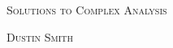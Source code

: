 \documentclass[dvipsnames]{scrbook}%
\begin{document}
\begin{center}
  \begin{center}
  \vspace*{\fill}
  \textsc{\LARGE Solutions to Complex Analysis}
  \bigskip

  \textsc{\LARGE Dustin Smith}
  \vspace*{\fill}
\end{center}
\end{center}

\newpage

\tableofcontents

\newpage


\end{document}
